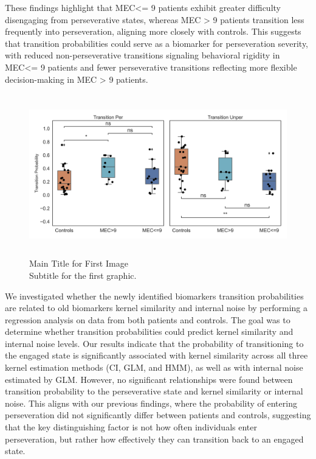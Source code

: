 These findings highlight that MEC<= 9 patients exhibit greater difficulty disengaging from perseverative states, whereas MEC > 9 patients transition less frequently into perseveration, aligning more closely with controls. This suggests that transition probabilities could serve as a biomarker for perseveration severity, with reduced non-perseverative transitions signaling behavioral rigidity in MEC<= 9 patients and fewer perseverative transitions reflecting more flexible decision-making in MEC > 9 patients.
\begin{figure}[H]
    \centering
    \includegraphics[width=17cm,height=7cm]{MainLayout/Images/chapter8/sticky_state.jpg}
    \caption{Main Title for First Image \\ \small Subtitle for the first graphic.}
    \label{fig:sticky_state}
\end{figure}
We investigated whether the newly identified biomarkers transition probabilities are related to old biomarkers kernel similarity and internal noise by performing a regression analysis on data from both patients and controls. The goal was to determine whether transition probabilities could predict kernel similarity and internal noise levels. Our results indicate that the probability of transitioning to the engaged state is significantly associated with kernel similarity across all three kernel estimation methods (CI, GLM, and HMM), as well as with internal noise estimated by GLM. However, no significant relationships were found between transition probability to the perseverative state and kernel similarity or internal noise. This aligns with our previous findings, where the probability of entering perseveration did not significantly differ between patients and controls, suggesting that the key distinguishing factor is not how often individuals enter perseveration, but rather how effectively they can transition back to an engaged state.
